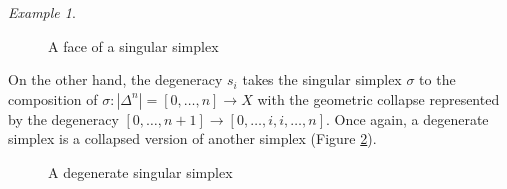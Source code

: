 \documentclass[12pt]{article}
\theoremstyle{plain}
\theoremstyle{definition}
\theoremstyle{remark}
\newtheorem{example}[theorem]{Example}
\begin{document}
\begin{example}
\begin{figure}[!htp]
\begin{center}
\end{center}
\caption{A face of a singular simplex}\label{F: fig11b}
\end{figure}


On the other hand, the degeneracy $s_i$ takes the singular simplex $\sigma$ to the composition of $\sigma\colon|\Delta^n|=[0,\ldots, n]\to X$ with the geometric collapse represented by the degeneracy $[0,\ldots, n+1]\to[0,\ldots, i,i,\ldots,n]$.  Once again, a degenerate simplex is a collapsed version of another simplex (Figure \ref{F: fig11c}). 




\begin{figure}[!htp]
\begin{center}
\end{center}
\caption{A degenerate singular simplex}\label{F: fig11c}
\end{figure}



\end{example}
\end{document}
